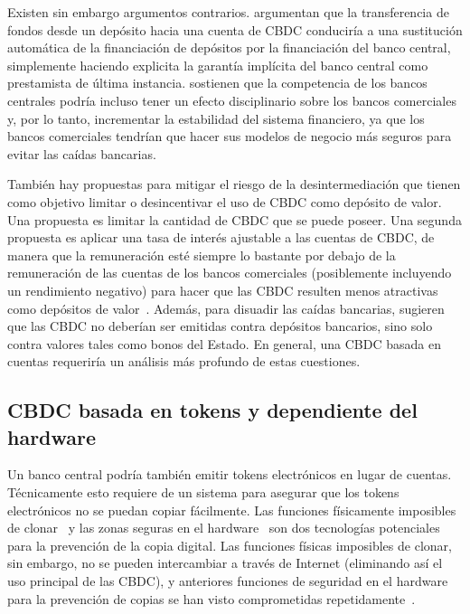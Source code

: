 \documentclass[a4paper,10pt]{article} %
\begin{document}
Existen sin embargo argumentos contrarios. \citet{Brunnermeier} argumentan
que la transferencia de fondos desde un
depósito hacia una cuenta de CBDC conduciría a una sustitución automática de
la financiación de depósitos por la financiación del banco central,
simplemente haciendo explicita la garantía implícita del banco central como
prestamista de última instancia. \citet{Berentsen}
sostienen que la competencia de los bancos centrales podría incluso tener un
efecto disciplinario sobre los bancos comerciales y, por lo tanto, incrementar
la estabilidad del sistema financiero, ya que los bancos comerciales tendrían
que hacer sus modelos de negocio más seguros para evitar las caídas bancarias.

También hay propuestas para mitigar el riesgo de la desintermediación
que tienen como objetivo limitar o desincentivar el uso de CBDC como
depósito de valor. Una propuesta es limitar la cantidad de CBDC que se
puede poseer. Una segunda propuesta es aplicar una tasa de interés
ajustable a las cuentas de CBDC, de manera que la remuneración esté
siempre lo bastante por debajo de la remuneración de las cuentas de los
bancos comerciales (posiblemente incluyendo un rendimiento negativo)
para hacer que las CBDC resulten menos atractivas como depósitos de
valor~\cite{Kumhof,Bindseil}. Además, para disuadir las
caídas bancarias, \citet{Kumhof} sugieren que las CBDC no
deberían ser emitidas contra depósitos bancarios, sino solo contra
valores tales como bonos del Estado. En general, una CBDC basada en
cuentas requeriría un análisis más profundo de estas cuestiones.


\subsection{CBDC basada en tokens y dependiente del hardware}
\label{cbdc-basada-en-tokens-y-dependiente-del-hardware}

Un banco central podría también emitir tokens electrónicos en lugar de
cuentas. Técnicamente esto requiere de un sistema para asegurar que los tokens
electrónicos no se puedan copiar fácilmente. Las funciones físicamente
imposibles de clonar~\cite[véase][]{Katzenbeisser} y las zonas seguras en
el hardware~\cite[véase][]{Alves,Pinto} son dos tecnologías potenciales para
la prevención de la copia digital. Las funciones físicas imposibles de clonar,
sin embargo, no se pueden intercambiar a través de Internet (eliminando así el
uso principal de las CBDC), y anteriores funciones de seguridad en el hardware
para la prevención de copias se han visto comprometidas
repetidamente~\cite[véase p. ej.][]{Wojtczuk,Johnston,Lapid}.
\end{document}
